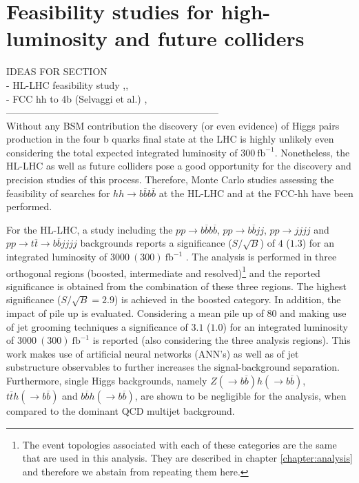 \section{Feasibility studies for high-luminosity and future colliders}
\label{section:feasibility}

IDEAS FOR SECTION \\
- HL-LHC feasibility study \cite{hhFeasibility},\cite{hhFeasibility_LHC},\cite{hhFeasibility1_LHC} \\
- FCC hh to 4b (Selvaggi et al.)  \cite{hh+jet_100TeV}, \cite{hhFeasibility1_100TeV}\\
------------------------------------------------------------------\\

Without any BSM contribution the discovery (or even evidence) of Higgs pairs production in the four b quarks final state at the LHC is highly unlikely even considering the total expected integrated luminosity of $300~\text{fb}^{-1}$. Nonetheless, the HL-LHC as well as future colliders pose a good opportunity for the discovery and precision studies of this process. Therefore, Monte Carlo studies assessing the feasibility of searches for $hh\rightarrow b\overline{b}b\overline{b}$ at the HL-LHC and at the FCC-hh have been performed.

For the HL-LHC, a study including the $pp\rightarrow b\overline{b}b\overline{b}$, $pp\rightarrow b\overline{b}jj$, $pp\rightarrow jjjj$ and $pp\rightarrow t\overline{t}\rightarrow b\overline{b}jjjj$ backgrounds reports a significance ($S/\sqrt{B}$) of $4$ ($1.3$) for an integrated luminosity of $3000~(300)~\text{fb}^{-1}$ \cite{hhFeasibility}. The analysis is performed in three orthogonal regions (boosted, intermediate and resolved)\footnote{The event topologies associated with each of these categories are the same that are used in this analysis. They are described in chapter \ref*{chapter:analysis} and therefore we abstain from repeating them here.} and the reported significance is obtained from the combination of these three regions. The highest significance ($S/\sqrt{B}=2.9$) is achieved in the boosted category. In addition, the impact of pile up is evaluated. Considering a mean pile up of 80 and making use of jet grooming techniques a significance of $3.1$ ($1.0$) for an integrated luminosity of $3000~(300)~\text{fb}^{-1}$ is reported (also considering the three analysis regions). This work makes use of artificial neural networks (ANN's) as well as of jet substructure observables to further increases the signal-background separation. Furthermore, single Higgs backgrounds, namely $Z(\rightarrow b\overline{b})h(\rightarrow b\overline{b})$, $t\overline{t}h(\rightarrow b\overline{b})$ and $b\overline{b}h(\rightarrow b\overline{b})$, are shown to be negligible for the analysis, when compared to the dominant QCD multijet background.

